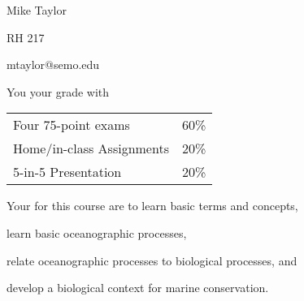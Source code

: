 \documentclass[t]{beamer}
\begin{document}

{
\begin{frame}[t]
\end{frame}
}

{
\begin{frame}[t,plain]
\large
\vspace{5ex}
\hangpara\hspace{17em} Mike Taylor

\hangpara\hspace{17em} RH 217

\hangpara\hspace{17em} mtaylor@semo.edu

\end{frame}
}

\begin{frame}[t]{You  your grade with}
	\begin{center}\large\begin{tabular}{@{}ll@{}}
	Four 75-point exams & 60\% \\
	Home/in-class Assignments & 20\% \\
	5-in-5 Presentation & 20\% \\
	\end{tabular}
	\end{center}
\end{frame}

{
\begin{frame}[t]
\end{frame}
}

\begin{frame}[t]{Your  for this course are to}
	\hangpara learn basic terms and concepts,

	\hangpara learn basic oceanographic processes,
	
	\hangpara relate oceanographic processes to biological processes, and

	\hangpara develop a biological context for marine conservation.
	
	

\end{frame}
\end{document}

